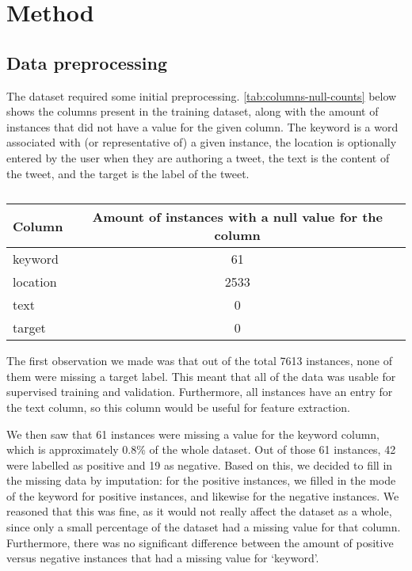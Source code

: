\section{Method}
\subsection{Data preprocessing}

The dataset required some initial preprocessing.
\autoref{tab:columns-null-counts} below shows the columns present in the training dataset, along with the amount of instances that did not have a value for the given column.
The keyword is a word associated with (or representative of) a given instance, the location is optionally entered by the user when they are authoring a tweet, the text is the content of the tweet, and the target is the label of the tweet.

\begin{table}[h!]
  \centering
  \vspace{1em}
  \renewcommand{\arraystretch}{1.5}
  \begin{tabular}{| l | c |}
    \hline
    \textbf{Column} & \textbf{Amount of instances with a null value for the column} \\ \hline
    keyword & 61 \\ \hline
    location & 2533 \\ \hline
    text & 0 \\ \hline
    target & 0 \\ \hline
  \end{tabular}
  \renewcommand{\arraystretch}{1}
  \vspace{1em}
  \caption{}
  \label{tab:columns-null-counts}
\end{table}


The first observation we made was that out of the total 7613 instances, none of them were missing a target label.
This meant that all of the data was usable for supervised training and validation.
Furthermore, all instances have an entry for the text column, so this column would be useful for feature extraction.

We then saw that 61 instances were missing a value for the keyword column, which is approximately 0.8\% of the whole dataset.
Out of those 61 instances, 42 were labelled as positive and 19 as negative. Based on this, we decided to fill in the missing data by imputation: for the positive instances, we filled in the mode of the keyword for positive instances, and likewise for the negative instances. We reasoned that this was fine, as it would not really affect the dataset as a whole, since only a small percentage of the dataset had a missing value for that column. Furthermore, there was no significant difference between the amount of positive versus negative instances that had a missing value for `keyword'.

